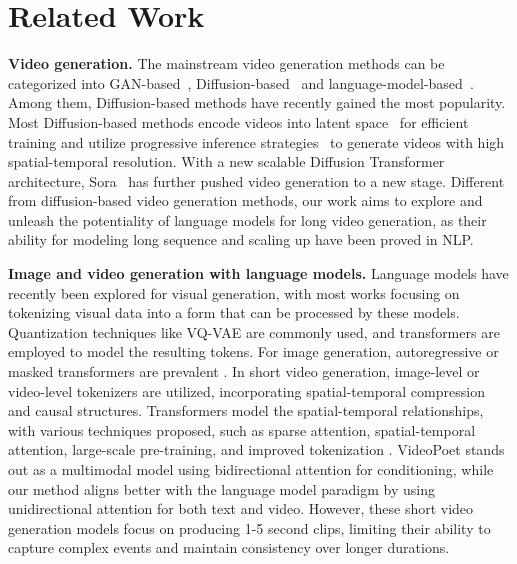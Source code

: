 
\section{Related Work}
\label{related_work}
\textbf{Video generation.}
The mainstream video generation methods can be categorized into GAN-based~\cite{goodfellow2014generative, vgan, mocogan}, Diffusion-based~\cite{ho2020ddpm, zhou2022magicvideo,ho2022video, ho2022imagen,SVD, make-a-video,girdhar2023emu, li2023videogen, zhang2023show1,openai2024sora} and language-model-based~\cite{vaswani2017attention,kondratyuk2023videopoet,villegas2022phenaki,yu2023language}. Among them, Diffusion-based methods have recently gained the most popularity. Most Diffusion-based methods encode videos into latent space~\cite{rombach2022high} for efficient training and utilize progressive inference strategies~\cite{ho2022imagen, he2022lvdm, AlignYourLatents} to generate videos with high spatial-temporal resolution. With a new scalable Diffusion Transformer~\cite{peebles2023scalable} architecture, Sora~\cite{openai2024sora} has further pushed video generation to a new stage. Different from diffusion-based video generation methods, our work aims to explore and unleash the potentiality of language models for long video generation, as their ability for modeling long sequence and scaling up have been proved in NLP.


\textbf{Image and video generation with language models.}
Language models have recently been explored for visual generation, with most works focusing on tokenizing visual data into a form that can be processed by these models. Quantization techniques like VQ-VAE \cite{vqvae,esser2020taming} are commonly used, and transformers are employed to model the resulting tokens.
For image generation, autoregressive or masked transformers are prevalent \cite{ramesh2021dalle, yu2022scaling, chang2023muse, chang2022maskgit, yu2024spae, sun2024autoregressive, tian2024visual}. In short video generation, image-level or video-level tokenizers are utilized, incorporating spatial-temporal compression and causal structures. Transformers model the spatial-temporal relationships, with various techniques proposed, such as sparse attention, spatial-temporal attention, large-scale pre-training, and improved tokenization \cite{yan2021videogpt,ge2022long, wu2021godiva, hong2022cogvideo, yu2023magvit}. VideoPoet \cite{kondratyuk2023videopoet} stands out as a multimodal model using bidirectional attention for conditioning, while our method aligns better with the language model paradigm by using unidirectional attention for both text and video.
However, these short video generation models focus on producing 1-5 second clips, limiting their ability to capture complex events and maintain consistency over longer durations.


